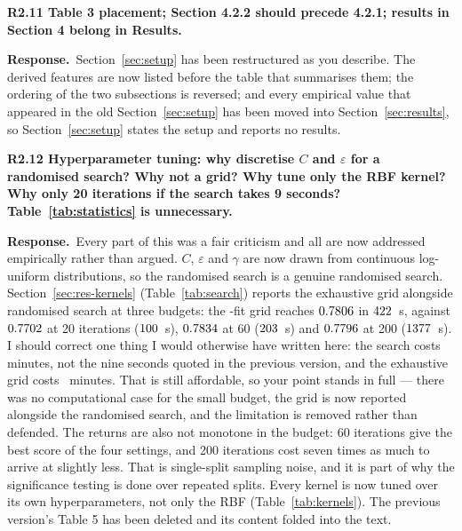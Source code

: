 \documentclass[11pt,a4paper]{article}
\newcommand{\reply}{\par\noindent\textbf{Response.}\ }
\newcommand{\pt}[1]{\par\medskip\noindent\textbf{#1}\par}
\begin{document}
\pt{R2.11 Table 3 placement; Section 4.2.2 should precede 4.2.1; results in Section 4 belong
in Results.}
\reply Section~\ref{sec:setup} has been restructured as you describe. The derived features are now listed
before the table that summarises them; the ordering of the two subsections is reversed; and
every empirical value that appeared in the old Section~\ref{sec:setup} has been moved into Section~\ref{sec:results}, so
Section~\ref{sec:setup} states the setup and reports no results.

\pt{R2.12 Hyperparameter tuning: why discretise $C$ and $\varepsilon$ for a randomised
search? Why not a grid? Why tune only the RBF kernel? Why only 20 iterations if the search
takes 9 seconds? Table~\ref{tab:statistics} is unnecessary.}
\reply Every part of this was a fair criticism and all are now addressed empirically rather
than argued. $C$, $\varepsilon$ and $\gamma$ are now drawn from continuous log-uniform
distributions, so the randomised search is a genuine randomised search. Section~\ref{sec:res-kernels}
(Table~\ref{tab:search}) reports the exhaustive grid alongside randomised search at three budgets: the
\GridFits{}-fit grid reaches $0.7806$ in $422$~s, against $0.7702$ at 20
iterations ($100$~s), $0.7834$ at 60 ($203$~s) and
$0.7796$ at 200 ($1377$~s). I should correct one thing I would
otherwise have written here: the search costs minutes, not the nine seconds quoted in the
previous version, and the exhaustive grid costs \GridSecsMin{}~minutes. That is still
affordable, so your point stands in full --- there was no computational case for the small
budget, the grid is now reported alongside the randomised search, and the limitation is
removed rather than defended. The returns are also not monotone in the budget: 60 iterations
give the best score of the four settings, and 200 iterations cost seven times as much to
arrive at slightly less. That is single-split sampling noise, and it is part of why the
significance testing is done over repeated splits. Every kernel is now tuned over its own hyperparameters, not only the RBF
(Table~\ref{tab:kernels}). The previous version's Table 5 has been deleted and its content folded into the text.
\end{document}
